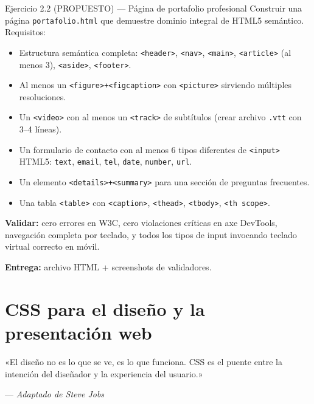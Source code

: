 \begin{cajaejercicio}{Ejercicio 2.2 (PROPUESTO) --- Página de portafolio profesional}
Construir una página \texttt{portafolio.html} que demuestre dominio
integral de HTML5 semántico. Requisitos:

\begin{itemize}
\item Estructura semántica completa: \texttt{<header>}, \texttt{<nav>},
\texttt{<main>}, \texttt{<article>} (al menos 3), \texttt{<aside>},
\texttt{<footer>}.
\item Al menos un \texttt{<figure>+<figcaption>} con
\texttt{<picture>} sirviendo múltiples resoluciones.
\item Un \texttt{<video>} con al menos un \texttt{<track>} de
subtítulos (crear archivo \texttt{.vtt} con 3--4 líneas).
\item Un formulario de contacto con al menos 6 tipos diferentes de
\texttt{<input>} HTML5: \texttt{text}, \texttt{email}, \texttt{tel},
\texttt{date}, \texttt{number}, \texttt{url}.
\item Un elemento \texttt{<details>+<summary>} para una sección de
preguntas frecuentes.
\item Una tabla \texttt{<table>} con \texttt{<caption>},
\texttt{<thead>}, \texttt{<tbody>}, \texttt{<th scope>}.
\end{itemize}

\textbf{Validar:} cero errores en W3C, cero violaciones críticas en
axe DevTools, navegación completa por teclado, y todos los tipos de
input invocando teclado virtual correcto en móvil.

\textbf{Entrega:} archivo HTML + screenshots de validadores.
\end{cajaejercicio}


\chapter{CSS para el diseño y la presentación web}
\label{cap:semana3}

\epigraph{«El diseño no es lo que se ve, es lo que funciona. CSS es
el puente entre la intención del diseñador y la experiencia del
usuario.»}{--- \textit{Adaptado de Steve Jobs}}

